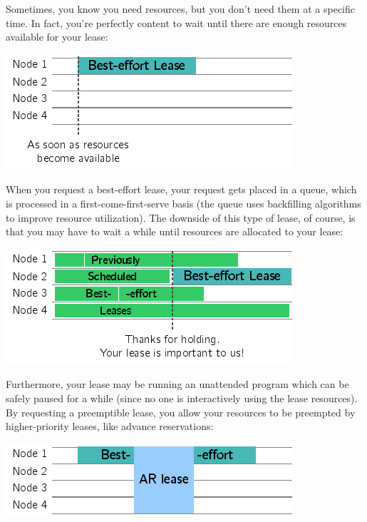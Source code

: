 Sometimes, you know you need resources, but you don't need them at a specific time. In fact, you're perfectly content to wait until there are enough resources available for your lease:

\begin{center}
\includegraphics{images/lease_be1.png}
\end{center}


When you request a best-effort lease, your request gets placed in a queue, which is processed in a first-come-first-serve basis (the queue uses backfilling algorithms to improve resource utilization). The downside of this type of lease, of course, is that you may have to wait a while until resources are allocated to your lease:

\begin{center}
\includegraphics{images/lease_be2.png}
\end{center}

Furthermore, your lease may be running an unattended program which can be safely paused for a while (since no one is interactively using the lease resources). By requesting a preemptible lease, you allow your resources to be preempted by higher-priority leases, like advance reservations:

\begin{center}
\includegraphics{images/lease_be3.png}
\end{center}

